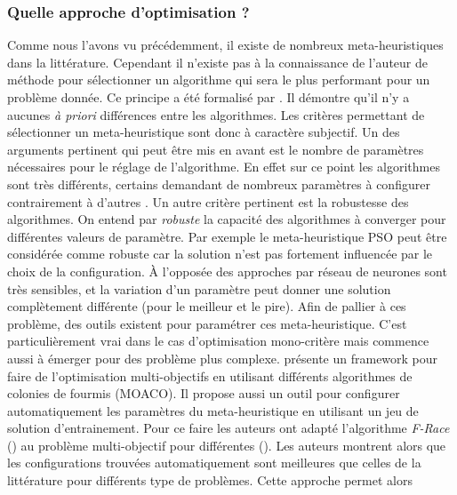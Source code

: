 \subsubsection{Quelle approche d’optimisation ?} %
\label{ssub:quelle_approche_d_optimisation_}
Comme nous l’avons vu précédemment, il existe de nombreux meta-heuristiques dans
la littérature. Cependant il n’existe pas à la connaissance de l’auteur de méthode
pour sélectionner un algorithme qui sera le plus performant pour un problème donnée.
Ce principe a été formalisé par \cite{Wolpert199767} . Il démontre qu’il
n’y a aucunes \emph{à priori} différences entre les algorithmes. Les critères
permettant de sélectionner un meta-heuristique sont donc à caractère subjectif.
Un des arguments pertinent qui peut être mis en avant est le nombre de paramètres
nécessaires pour le réglage de l’algorithme. En effet sur ce point les algorithmes
sont très différents, certains demandant de nombreux paramètres à configurer
 contrairement
à d’autres . Un autre critère pertinent
est la robustesse des algorithmes. On entend par \emph{robuste} la capacité des algorithmes
à converger pour différentes valeurs de paramètre. Par exemple le meta-heuristique PSO
peut être considérée comme robuste  car la solution n’est
pas fortement influencée par le choix de la configuration.
À l’opposée des approches par réseau de neurones  sont
très sensibles, et la variation d’un paramètre peut donner une solution complètement
différente (pour le meilleur et le pire).
Afin de pallier à ces problème, des outils existent pour paramétrer ces meta-heuristique.
C’est particulièrement vrai dans le cas d’optimisation mono-critère mais commence
aussi à émerger pour des problème plus complexe. \cite{Lopez-Ibanez2012861}
présente un framework pour faire de l’optimisation multi-objectifs en utilisant
différents algorithmes de colonies de fourmis (MOACO). Il propose aussi un outil
pour configurer automatiquement les paramètres du meta-heuristique en utilisant un jeu de solution
d’entrainement. Pour ce faire les auteurs ont adapté l’algorithme \emph{F-Race} (\cite{Lopez-Ibanez2011})
au problème multi-objectif pour différentes (\cite{Birattari2010311,Zitzler2003117}). Les auteurs montrent
alors que les configurations trouvées automatiquement sont meilleures que celles
de la littérature pour différents type de problèmes. Cette approche permet alors
